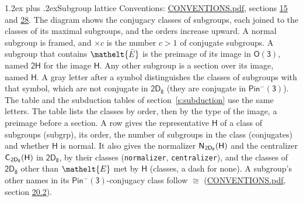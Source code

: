 \documentclass[10pt,a4paper]{article}
\makeatletter
\renewcommand\section{\@startsection{section}{1}{\z@}{-3ex plus -1ex minus -.2ex}%
  {1.2ex plus .2ex}{\normalfont\large\sffamily\bfseries\color{parttitle}}}
\numberwithin{equation}{section}
\newcommand{\eltfont}[1]{{\let\sigma\eltsigma\mathelt{#1}}}
\newcommand{\grp}[1]{\mathsf{#1}}
\newcommand{\cls}[1]{\eltfont{#1}}
\newcommand{\elt}[1]{\eltfont{#1}}
\newcommand{\samecls}{\cong}
\newcommand{\barred}[1]{\bar{#1}}
\newcommand{\hairsp}{\mkern1mu}
\makeatother
\begin{document}
\section{Subgroup lattice}\label{s:subgroups}
Conventions: \href{../../CONVENTIONS.pdf}{CONVENTIONS.pdf}, sections \href{../../../rotation/CONVENTIONS.pdf\#conv.15}{15} and \href{../../CONVENTIONS.pdf\#conv.28}{28}.
The diagram shows the conjugacy classes of subgroups, each joined to the classes of its maximal subgroups, and the orders increase upward. \label{n:index.conjugates.c}\label{n:mark.conjugates}A normal subgroup is framed, and ${\times}c$ is the number $c > 1$ of conjugate subgroups. \label{n:group.H}A subgroup that contains $\elt{\barred{E}}$ is the preimage of its image in $\grp{O(3)}$, named $\grp{2H}$ for the image $\grp{H}$. Any other subgroup is a section over its image, named $\grp{H}$. \label{n:mark.letter}A gray letter after a symbol distinguishes the classes of subgroups with that symbol, which are not conjugate in $\grp{2D_{8}}$ (they are conjugate in \href{Pinminus3.pdf}{$\grp{Pin^{-}(3)}$}). The table and the subduction tables of section~\ref{s:subduction} use the same letters. The table lists the classes by order, then by the type of the image, a preimage before a section. \label{n:head.subgroup}\label{n:head.order}\label{n:head.conjugates}\label{n:head.normal}A row gives the representative $\grp{H}$ of a class of subgroups (subgrp), its order, the number of subgroups in the class (conjugates) and whether $\grp{H}$ is normal. \label{n:group.normalizer}\label{n:group.centralizer}\label{n:head.classes}It also gives the normalizer $\grp{N}_{\hairsp \grp{2D_{8}}}(\grp{H})$ and the centralizer $\grp{C}_{\hairsp \grp{2D_{8}}}(\grp{H})$ in $\grp{2D_{8}}$, by their classes (\texttt{normalizer}, \texttt{centralizer}), and the classes of $\grp{2D_{8}}$ other than $\cls{E}$ met by $\grp{H}$ (classes, a dash for none). A subgroup's other names in its \href{Pinminus3.pdf}{$\grp{Pin^{-}(3)}$}-conjugacy class follow $\samecls$ (\href{../../CONVENTIONS.pdf}{CONVENTIONS.pdf}, section \href{../../CONVENTIONS.pdf\#conv.20.2}{20.2}).
\end{document}
